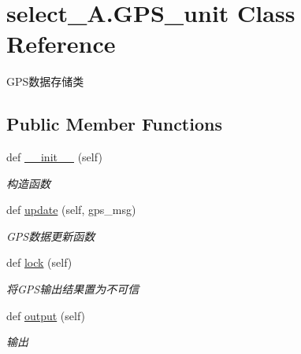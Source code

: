 \hypertarget{classselect___a_1_1_g_p_s__unit}{}\section{select\+\_\+\+A.\+G\+P\+S\+\_\+unit Class Reference}
\label{classselect___a_1_1_g_p_s__unit}


G\+P\+S数据存储类  


\subsection*{Public Member Functions}
\begin{DoxyCompactItemize}
\item 
def \hyperlink{classselect___a_1_1_g_p_s__unit_ab2b3df72f775ec31378b7aa46535ed12}{\+\_\+\+\_\+init\+\_\+\+\_\+} (self)
\begin{DoxyCompactList}\small\item\em 构造函数 \end{DoxyCompactList}\item 
def \hyperlink{classselect___a_1_1_g_p_s__unit_afdce25cff0d943b642562b409bad71d7}{update} (self, gps\+\_\+msg)
\begin{DoxyCompactList}\small\item\em G\+P\+S数据更新函数 \end{DoxyCompactList}\item 
def \hyperlink{classselect___a_1_1_g_p_s__unit_a479fed8895f826db72f0a465a5915e08}{lock} (self)
\begin{DoxyCompactList}\small\item\em 将\+G\+P\+S输出结果置为不可信 \end{DoxyCompactList}\item 
def \hyperlink{classselect___a_1_1_g_p_s__unit_a687b0211ca2109c490abdb0ead0a0f49}{output} (self)
\begin{DoxyCompactList}\small\item\em 输出 \end{DoxyCompactList}\end{DoxyCompactItemize}
